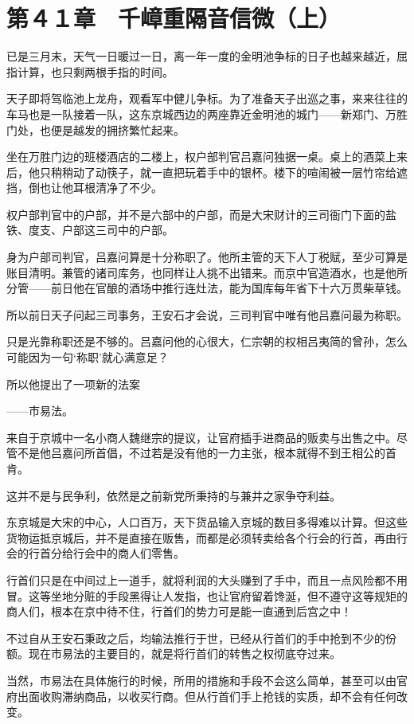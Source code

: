 \section{第４１章　千嶂重隔音信微（上）}

已是三月末，天气一日暖过一日，离一年一度的金明池争标的日子也越来越近，屈指计算，也只剩两根手指的时间。

天子即将驾临池上龙舟，观看军中健儿争标。为了准备天子出巡之事，来来往往的车马也是一队接着一队，这东京城西边的两座靠近金明池的城门——新郑门、万胜门处，也便是越发的拥挤繁忙起来。

坐在万胜门边的班楼酒店的二楼上，权户部判官吕嘉问独据一桌。桌上的酒菜上来后，他只稍稍动了动筷子，就一直把玩着手中的银杯。楼下的喧闹被一层竹帘给遮挡，倒也让他耳根清净了不少。

权户部判官中的户部，并不是六部中的户部，而是大宋财计的三司衙门下面的盐铁、度支、户部这三司中的户部。

身为户部司判官，吕嘉问算是十分称职了。他所主管的天下人丁税赋，至少可算是账目清明。兼管的诸司库务，也同样让人挑不出错来。而京中官造酒水，也是他所分管——前日他在官酿的酒场中推行连灶法，能为国库每年省下十六万贯柴草钱。

所以前日天子问起三司事务，王安石才会说，三司判官中唯有他吕嘉问最为称职。

只是光靠称职还是不够的。吕嘉问他的心很大，仁宗朝的权相吕夷简的曾孙，怎么可能因为一句‘称职’就心满意足？

所以他提出了一项新的法案

——市易法。

来自于京城中一名小商人魏继宗的提议，让官府插手进商品的贩卖与出售之中。尽管不是他吕嘉问所首倡，不过若是没有他的一力主张，根本就得不到王相公的首肯。

这并不是与民争利，依然是之前新党所秉持的与兼并之家争夺利益。

东京城是大宋的中心，人口百万，天下货品输入京城的数目多得难以计算。但这些货物运抵京城后，并不是直接在贩售，而都是必须转卖给各个行会的行首，再由行会的行首分给行会中的商人们零售。

行首们只是在中间过上一道手，就将利润的大头赚到了手中，而且一点风险都不用冒。这等坐地分赃的手段黑得让人发指，也让官府留着馋涎，但不遵守这等规矩的商人们，根本在京中待不住，行首们的势力可是能一直通到后宫之中！

不过自从王安石秉政之后，均输法推行于世，已经从行首们的手中抢到不少的份额。现在市易法的主要目的，就是将行首们的转售之权彻底夺过来。

当然，市易法在具体施行的时候，所用的措施和手段不会这么简单，甚至可以由官府出面收购滞纳商品，以收买行商。但从行首们手上抢钱的实质，却不会有任何改变。

